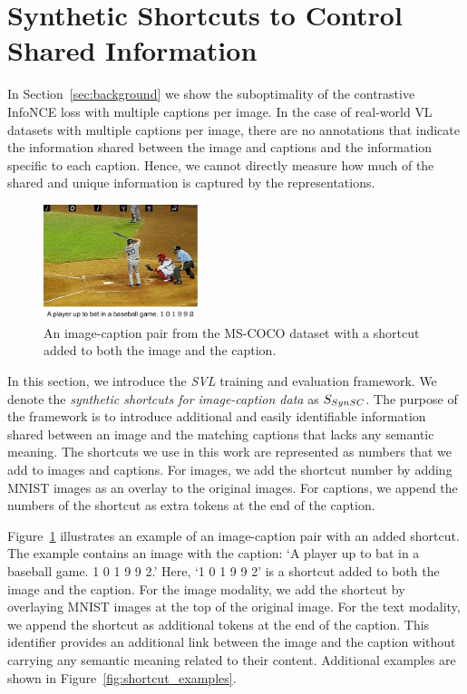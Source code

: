 
\section{Synthetic Shortcuts to Control Shared Information}
\label{eval:method}

In Section~\ref{sec:background} we show the suboptimality of the contrastive InfoNCE loss with multiple captions per image.
In the case of real-world \ac{VL} datasets with multiple captions per image, there are no annotations that indicate the information shared between the image and captions and the information specific to each caption.
Hence, we cannot directly measure how much of the shared and unique information is captured by the representations.

\begin{figure}
	\centering
	\includegraphics[width=0.4\textwidth]{figures/shortcut-example}
	\caption{An image-caption pair from the MS-COCO dataset with a shortcut added to both the image and the caption.}
	\label{fig:shortcut-example}
\end{figure}

In this section, we introduce the \textit{\acf{SVL}} training and evaluation framework.
We denote the \textit{synthetic shortcuts for image-caption data} as $S_{SynSC}{}$.
The purpose of the framework is to introduce additional and easily identifiable information shared between an image and the matching captions that lacks any semantic meaning. 
The shortcuts we use in this work are represented as numbers that we add to images and captions.
For images, we add the shortcut number by adding MNIST images as an overlay to the original images.
For captions, we append the numbers of the shortcut as extra tokens at the end of the caption.

Figure~\ref{fig:shortcut-example} illustrates an example of an image-caption pair with an added shortcut.
The example contains an image with the caption: `A player up to bat in a baseball game. 1 0 1 9 9 2.'
Here, `1 0 1 9 9 2' is a shortcut added to both the image and the caption. 
For the image modality, we add the shortcut by overlaying MNIST images at the top of the original image.
For the text modality, we append the shortcut as additional tokens at the end of the caption.
This identifier provides an additional link between the image and the caption without carrying any semantic meaning related to their content. 
Additional examples are shown in Figure~\ref{fig:shortcut_examples}.

